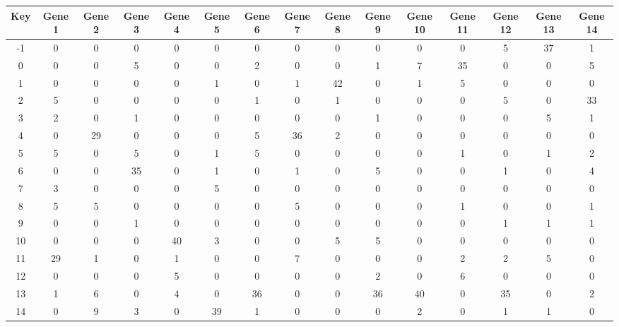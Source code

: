 \begin{tabular}{|c|c|c|c|c|c|c|c|c|c|c|c|c|c|c|}
\hline
Key & Gene 1 & Gene 2 & Gene 3 & Gene 4 & Gene 5 & Gene 6 & Gene 7 & Gene 8 & Gene 9 & Gene 10 & Gene 11 & Gene 12 & Gene 13 & Gene 14 \\
\hline
-1 & 0 & 0 & 0 & 0 & 0 & 0 & 0 & 0 & 0 & 0 & 0 & 5 & 37 & 1 \\
0 & 0 & 0 & 5 & 0 & 0 & 2 & 0 & 0 & 1 & 7 & 35 & 0 & 0 & 5 \\
1 & 0 & 0 & 0 & 0 & 1 & 0 & 1 & 42 & 0 & 1 & 5 & 0 & 0 & 0 \\
2 & 5 & 0 & 0 & 0 & 0 & 1 & 0 & 1 & 0 & 0 & 0 & 5 & 0 & 33 \\
3 & 2 & 0 & 1 & 0 & 0 & 0 & 0 & 0 & 1 & 0 & 0 & 0 & 5 & 1 \\
4 & 0 & 29 & 0 & 0 & 0 & 5 & 36 & 2 & 0 & 0 & 0 & 0 & 0 & 0 \\
5 & 5 & 0 & 5 & 0 & 1 & 5 & 0 & 0 & 0 & 0 & 1 & 0 & 1 & 2 \\
6 & 0 & 0 & 35 & 0 & 1 & 0 & 1 & 0 & 5 & 0 & 0 & 1 & 0 & 4 \\
7 & 3 & 0 & 0 & 0 & 5 & 0 & 0 & 0 & 0 & 0 & 0 & 0 & 0 & 0 \\
8 & 5 & 5 & 0 & 0 & 0 & 0 & 5 & 0 & 0 & 0 & 1 & 0 & 0 & 1 \\
9 & 0 & 0 & 1 & 0 & 0 & 0 & 0 & 0 & 0 & 0 & 0 & 1 & 1 & 1 \\
10 & 0 & 0 & 0 & 40 & 3 & 0 & 0 & 5 & 5 & 0 & 0 & 0 & 0 & 0 \\
11 & 29 & 1 & 0 & 1 & 0 & 0 & 7 & 0 & 0 & 0 & 2 & 2 & 5 & 0 \\
12 & 0 & 0 & 0 & 5 & 0 & 0 & 0 & 0 & 2 & 0 & 6 & 0 & 0 & 0 \\
13 & 1 & 6 & 0 & 4 & 0 & 36 & 0 & 0 & 36 & 40 & 0 & 35 & 0 & 2 \\
14 & 0 & 9 & 3 & 0 & 39 & 1 & 0 & 0 & 0 & 2 & 0 & 1 & 1 & 0 \\
\hline
\end{tabular}